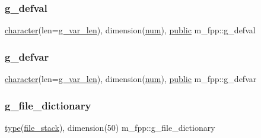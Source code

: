 \mbox{\label{namespacem__fpp_a1a99b8d1526c19ed196bc1c1ba53ba4c}} 
\subsubsection{\texorpdfstring{g\+\_\+defval}{g\_defval}}
{\footnotesize\ttfamily \hyperlink{option__stopwatch_83_8txt_abd4b21fbbd175834027b5224bfe97e66}{character}(len=\hyperlink{namespacem__fpp_a99c57ea4a304975a7afafcf0b292db06}{g\+\_\+var\+\_\+len}), dimension(\hyperlink{namespacem__fpp_adaa4b6694f65973ef728ad2189a8e6f2}{num}), \hyperlink{M__stopwatch_83_8txt_a2f74811300c361e53b430611a7d1769f}{public} m\+\_\+fpp\+::g\+\_\+defval}

\mbox{\label{namespacem__fpp_a07ee856eed5841b997794fe7c37bfed6}} 
\subsubsection{\texorpdfstring{g\+\_\+defvar}{g\_defvar}}
{\footnotesize\ttfamily \hyperlink{option__stopwatch_83_8txt_abd4b21fbbd175834027b5224bfe97e66}{character}(len=\hyperlink{namespacem__fpp_a99c57ea4a304975a7afafcf0b292db06}{g\+\_\+var\+\_\+len}), dimension(\hyperlink{namespacem__fpp_adaa4b6694f65973ef728ad2189a8e6f2}{num}), \hyperlink{M__stopwatch_83_8txt_a2f74811300c361e53b430611a7d1769f}{public} m\+\_\+fpp\+::g\+\_\+defvar}

\mbox{\label{namespacem__fpp_a4d652f22f13a938d8b879d2da436e3e7}} 
\subsubsection{\texorpdfstring{g\+\_\+file\+\_\+dictionary}{g\_file\_dictionary}}
{\footnotesize\ttfamily \hyperlink{stop__watch_83_8txt_a70f0ead91c32e25323c03265aa302c1c}{type}(\hyperlink{structm__fpp_1_1file__stack}{file\+\_\+stack}), dimension(50) m\+\_\+fpp\+::g\+\_\+file\+\_\+dictionary}

\mbox{\label{namespacem__fpp_a90e1828ada2e3a70200d2172c2ca9ef2}} 

